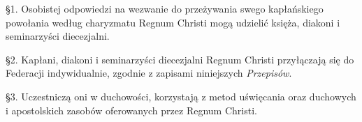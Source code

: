 
 \S{}1. Osobistej odpowiedzi na wezwanie do przeżywania swego kapłańskiego powołania według charyzmatu Regnum Christi mogą udzielić księża, diakoni i seminarzyści diecezjalni. 

\S{}2. Kapłani, diakoni i seminarzyści diecezjalni Regnum Christi przyłączają się do Federacji indywidualnie, zgodnie z zapisami niniejszych {\em Przepisów}.

\S{}3. Uczestniczą oni w duchowości, korzystają z metod uświęcania oraz duchowych i apostolskich zasobów oferowanych przez Regnum Christi.
